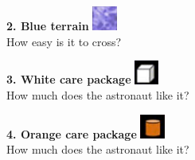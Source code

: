 \documentclass{beamer}
\begin{document}
\begin{frame}
\begin{columns}
\begin{column}{0.5\textwidth}
\textbf{2. Blue terrain} \includegraphics[width=0.8cm]{blue_terrain.png}\\
How easy is it to cross?
\vspace{0.2cm}

\textbf{3. White care package} \includegraphics[width=0.8cm]{white_carepackage.png}\\
How much does the astronaut like it?
\vspace{0.2cm}

\textbf{4. Orange care package} \includegraphics[width=0.8cm]{orange_carepackage.png}\\
How much does the astronaut like it?
\end{column}
\end{columns}
\end{frame}
\end{document}
